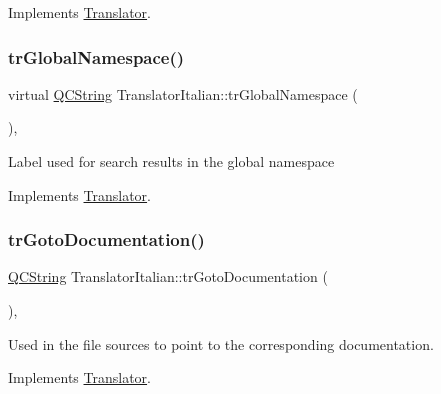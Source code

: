 Implements \mbox{\hyperlink{class_translator}{Translator}}.

\mbox{\label{class_translator_italian_a71627a12293fe9dea4888f56060b9e4b}} 
\subsubsection{\texorpdfstring{trGlobalNamespace()}{trGlobalNamespace()}}
{\footnotesize\ttfamily virtual \mbox{\hyperlink{class_q_c_string}{Q\+C\+String}} Translator\+Italian\+::tr\+Global\+Namespace (\begin{DoxyParamCaption}{ }\end{DoxyParamCaption})\hspace{0.3cm}{\ttfamily [inline]}, {\ttfamily [virtual]}}

Label used for search results in the global namespace 

Implements \mbox{\hyperlink{class_translator}{Translator}}.

\mbox{\label{class_translator_italian_ad1422e8d28f9d6502a04c78e76d023ba}} 
\subsubsection{\texorpdfstring{trGotoDocumentation()}{trGotoDocumentation()}}
{\footnotesize\ttfamily \mbox{\hyperlink{class_q_c_string}{Q\+C\+String}} Translator\+Italian\+::tr\+Goto\+Documentation (\begin{DoxyParamCaption}{ }\end{DoxyParamCaption})\hspace{0.3cm}{\ttfamily [inline]}, {\ttfamily [virtual]}}

Used in the file sources to point to the corresponding documentation. 

Implements \mbox{\hyperlink{class_translator}{Translator}}.

\mbox{\label{class_translator_italian_a57957a95d5e40009eacb73ac58879bde}} 
